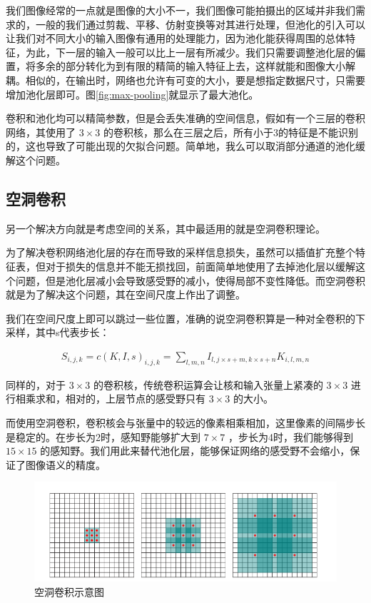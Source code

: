 我们图像经常的一点就是图像的大小不一，我们图像可能拍摄出的区域并非我们需求的，一般的我们通过剪裁、平移、仿射变换等对其进行处理，但池化的引入可以让我们对不同大小的输入图像有通用的处理能力，因为池化能获得周围的总体特征，为此，下一层的输入一般可以比上一层有所减少。我们只需要调整池化层的偏置，将多余的部分转化为到有限的精简的输入特征上去，这样就能和图像大小解耦。相似的，在输出时，网络也允许有可变的大小，要是想指定数据尺寸，只需要增加池化层即可。图\ref{fig:max-pooling}就显示了最大池化。

卷积和池化均可以精简参数，但是会丢失准确的空间信息，假如有一个三层的卷积网络，其使用了 $ 3 \times 3 $ 的卷积核，那么在三层之后，所有小于3的特征是不能识别的，这也导致了可能出现的欠拟合问题。简单地，我么可以取消部分通道的池化缓解这个问题。

\subsection{空洞卷积}

另一个解决方向就是考虑空间的关系，其中最适用的就是空洞卷积理论。

为了解决卷积网络池化层的存在而导致的采样信息损失，虽然可以插值扩充整个特征表，但对于损失的信息并不能无损找回，前面简单地使用了去掉池化层以缓解这个问题，但是池化层减小会导致感受野的减小，使得局部不变性降低。而空洞卷积就是为了解决这个问题，其在空间尺度上作出了调整。

我们在空间尺度上即可以跳过一些位置，准确的说空洞卷积算是一种对全卷积的下采样，其中s代表步长：

\begin{eqnarray}
    S_{i,j,k} = c(K,I,s)_{i,j,k} = \sum_{l,m,n}I_{l,j \times s+m ,k \times s +n}K_{i,l,m,n}
\end{eqnarray}


同样的，对于 $ 3 \times 3 $ 的卷积核，传统卷积运算会让核和输入张量上紧凑的 $ 3 \times 3 $ 进行相乘求和，相对的，上层节点的感受野只有 $ 3 \times 3 $ 的大小。

而使用空洞卷积，卷积核会与张量中的较远的像素相乘相加，这里像素的间隔步长是稳定的。在步长为2时，感知野能够扩大到 $ 7 \times 7 $ ，步长为4时，我们能够得到 $ 15 \times 15 $ 的感知野。我们用此来替代池化层，能够保证网络的感受野不会缩小，保证了图像语义的精度。 

\begin{figure}[!tbp]
    \centering
    \includegraphics[width=\textwidth]{figures/dilated-convolution.png}
    \caption{空洞卷积\cite{yu2015multi}示意图}
    \vspace{-1em}
    \label{fig:dilated-convolution}
\end{figure}

